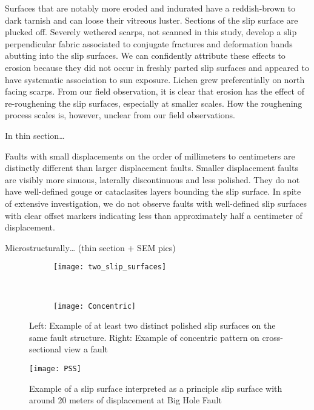 \documentclass[12pt,a4paper]{article}
\begin{document}
Surfaces that are notably more eroded and indurated have a reddish-brown to dark tarnish and can loose their vitreous luster. Sections of the slip surface are plucked off. Severely wethered scarps, not scanned in this study, develop a slip perpendicular fabric associated to conjugate fractures and deformation bands abutting into the slip surfaces. We can confidently attribute these effects to erosion because they did not occur in freshly parted slip surfaces and appeared to have systematic association to sun exposure. Lichen grew preferentially on north facing scarps. From our field observation, it is clear that erosion has the effect of re-roughening the slip surfaces, especially at smaller scales. How the roughening process scales is, however, unclear from our field observations.

In thin section…

Faults with small displacements on the order of millimeters to centimeters are distinctly different than larger displacement faults. Smaller displacement faults are visibly more sinuous, laterally discontinuous and less polished.  They do not have well-defined gouge or cataclasites layers bounding the slip surface. In spite of extensive investigation, we do not observe faults with well-defined slip surfaces with clear offset markers indicating less than approximately half a centimeter of displacement. 

Microstructurally… (thin section + SEM pics)

\begin{figure}
	\centering
	\begin{subfigure}[b]{0.4\textwidth}
		\texttt{[image: two\_slip\_surfaces]}
	\end{subfigure}
	~
	\begin{subfigure}[b]{0.4\textwidth}
		\texttt{[image: Concentric]}
	\end{subfigure}
	\caption{Left: Example of at least two distinct polished slip surfaces on the same fault structure. Right: Example of concentric pattern on cross-sectional view a fault}
	\label{many_surf}
\end{figure}	

\begin{figure}
	\centering
    \texttt{[image: PSS]}
	
	\caption{Example of a slip surface interpreted as a principle slip surface with around 20 meters of displacement at Big Hole Fault}
	\label{PSS}
\end{figure}
\end{document}
